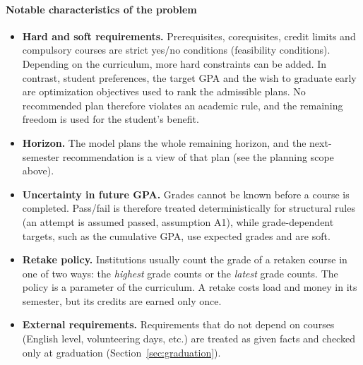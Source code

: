 \paragraph{Notable characteristics of the problem}
\begin{itemize}
      \item \textbf{Hard and soft requirements.} Prerequisites, corequisites, credit limits and compulsory courses are strict yes/no conditions (feasibility conditions). Depending on the curriculum, more hard constraints can be added. In contrast, student preferences, the target GPA and the wish to graduate early are optimization objectives used to rank the admissible plans. No recommended plan therefore violates an academic rule, and the remaining freedom is used for the student's benefit.
      \item \textbf{Horizon.} The model plans the whole remaining horizon, and the next-semester recommendation is a view of that plan (see the planning scope above).
      \item \textbf{Uncertainty in future GPA.} Grades cannot be known before a course is completed. Pass/fail is therefore treated deterministically for structural rules (an attempt is assumed passed, assumption A1), while grade-dependent targets, such as the cumulative GPA, use expected grades and are soft.
      \item \textbf{Retake policy.} Institutions usually count the grade of a retaken course in one of two ways: the \emph{highest} grade counts or the \emph{latest} grade counts. The policy is a parameter of the curriculum. A retake costs load and money in its semester, but its credits are earned only once.
      \item \textbf{External requirements.} Requirements that do not depend on courses (English level, volunteering days, etc.) are treated as given facts and checked only at graduation (Section~\ref{sec:graduation}).
\end{itemize}


